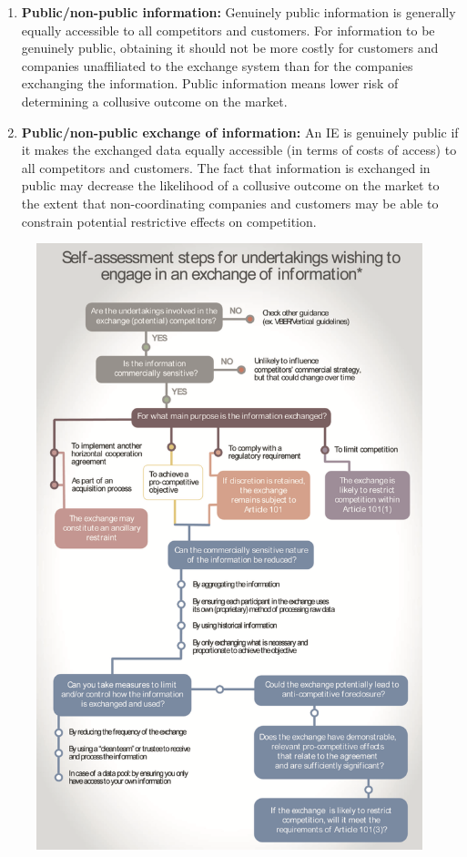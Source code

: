 \begin{enumerate}
            \item \textbf{Public/non-public information:} Genuinely public information is generally equally accessible to all competitors and customers. For information to be genuinely public, obtaining it should not be more costly for customers and companies unaffiliated to the exchange system than for the companies exchanging the information. Public information means lower risk of determining a collusive outcome on the market.
            
            \item \textbf{Public/non-public exchange of information:} An IE is genuinely public if it makes the exchanged data equally accessible (in terms of costs of access) to all competitors and customers. The fact that information is exchanged in public may decrease the likelihood of a collusive outcome on the market to the extent that non-coordinating companies and customers may be able to constrain potential restrictive effects on competition.
        \end{enumerate}

\newpage

    \begin{figure}[h!]
        \centering
        \includegraphics[width=1\linewidth]{graphics/L9-2_Final_Info_Exchange.png}
    \end{figure}

